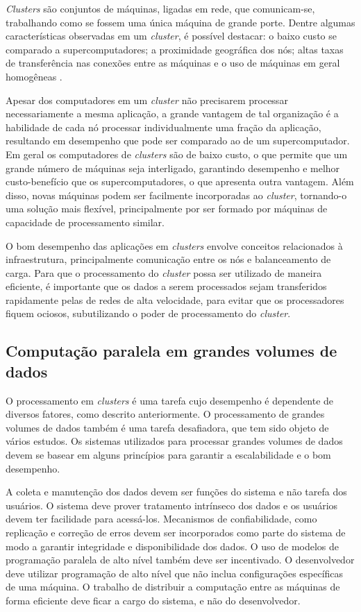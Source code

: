 \textit{Clusters} são conjuntos de máquinas, ligadas em rede, que comunicam-se, trabalhando como se fossem uma única máquina de grande porte. 
Dentre algumas características observadas em um \textit{cluster}, é possível destacar: o baixo custo se comparado a supercomputadores; a proximidade geográfica dos nós; altas taxas de transferência nas conexões entre as máquinas e o uso de máquinas em geral homogêneas \cite{Toth:2008}.

Apesar dos computadores em um \textit{cluster} não precisarem processar necessariamente a mesma aplicação, a grande vantagem de tal organização é a habilidade de cada nó processar individualmente uma fração da aplicação, resultando em desempenho que pode ser comparado ao de um supercomputador.
Em geral os computadores de \textit{clusters} são de baixo custo, o que permite que um grande número de máquinas seja interligado, garantindo desempenho e melhor custo-benefício que os supercomputadores, o que apresenta outra vantagem. Além disso, novas máquinas podem ser facilmente incorporadas  ao \textit{cluster}, tornando-o uma solução mais flexível, principalmente por ser formado por máquinas de capacidade de processamento similar.

O bom desempenho das aplicações em \textit{clusters} envolve conceitos relacionados à infraestrutura, principalmente comunicação entre os nós e balanceamento de carga.
Para que o processamento do \textit{cluster} possa ser utilizado de maneira eficiente, é importante que os dados a serem processados sejam transferidos rapidamente pelas de redes de alta velocidade, para evitar que os processadores fiquem ociosos, subutilizando o poder de processamento do \textit{cluster}\cite{Rauber:2010}. 


\subsection{Computação paralela em grandes volumes de dados}
O processamento em \textit{clusters} é uma tarefa cujo desempenho é dependente de diversos fatores, como descrito anteriormente. O processamento de grandes volumes de dados também é uma tarefa desafiadora, que tem sido objeto de vários estudos. Os sistemas utilizados para processar grandes volumes de dados devem se basear em alguns princípios para garantir a escalabilidade e o bom desempenho.

A coleta e manutenção dos dados devem ser funções do sistema e não tarefa dos usuários. O sistema deve prover tratamento intrínseco dos dados  e os usuários devem ter facilidade para acessá-los. Mecanismos de confiabilidade, como replicação e  correção de erros devem ser incorporados como parte do sistema de modo a garantir integridade e disponibilidade dos dados.
O uso de modelos de programação paralela de alto nível também deve ser incentivado. O desenvolvedor deve utilizar programação de alto nível que não inclua configurações específicas de uma máquina. O trabalho de distribuir a computação entre as máquinas de forma eficiente deve ficar a cargo do sistema, e não do desenvolvedor.

